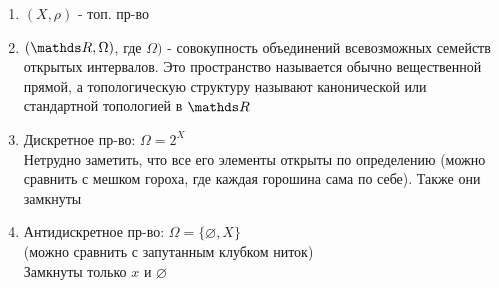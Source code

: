 \documentclass[geometry.tex]{subfiles}
\begin{document}
  \begin{examples}
      \begin{enumerate}
          \item $(X, \rho)$ - топ. пр-во
	\item $(\R, \Omega)$, где $\Omega)$ - совокупность объединений всевозможных семейств открытых интервалов. Это пространство называется обычно вещественной прямой, а топологическую структуру называют канонической или стандартной топологией в $\R$
          \item Дискретное пр-во: $\Omega = 2^X$\\
          Нетрудно заметить, что все его элементы открыты по определению (можно сравнить с мешком гороха, где каждая горошина сама по себе). Также они замкнуты
          \item Антидискретное пр-во: $\Omega = \{\varnothing, X\}$\\
          (можно сравнить с запутанным клубком ниток)\\
          Замкнуты только $x$ и $\varnothing$


\end{enumerate}
\end{examples}
\end{document}
